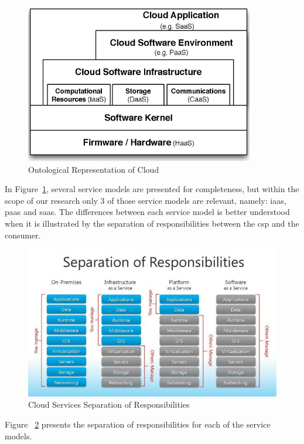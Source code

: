 \documentclass[12pt, titlepage]{uo_temp}
\begin{document}
       \begin{figure}[h]
         \centering
	 \includegraphics[width=100mm]{images/c_ontology.png}
	 \caption{Ontological Representation of Cloud\label{c_ontology} \cite{ontology}}
       \end{figure}

       In Figure~\ref{c_ontology}, several service models are presented for completeness,
       but within the scope of our research only 3 of those service models are relevant,
       namely: \gls{iaas}, \gls{paas} and \gls{saas}. The differences between each
       service model is better understood when it is illustrated by the separation of
       responsibilities between the \gls{csp} and the consumer.

       \begin{figure}[h]
         \centering
	 \includegraphics[width=125mm]{images/cloud_sep_of_resp.jpg}
	 \caption{Cloud Services Separation of Responsibilities\label{cloud_sep_of_resp}
           \cite{blewis}}
       \end{figure}

     Figure ~\ref{cloud_sep_of_resp} presents the separation of responsibilities for
     each of the service models.
\end{document}
